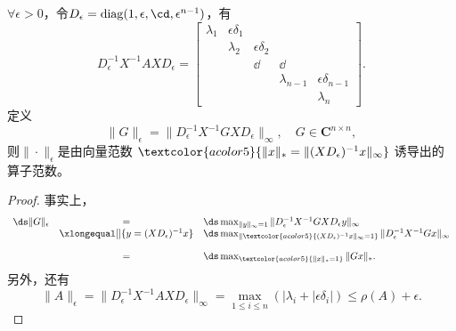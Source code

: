 \begin{frame}\ft{\subsecname}

\begin{zhengming}
$\forall \epsilon > 0$，令$D_{\epsilon} = \mathrm{diag} (1, \epsilon, \cd, \epsilon^{n-1})$，有
$$
D_{\epsilon}^{-1}X^{-1} A X D_{\epsilon} = \left[
\begin{array}{ccccc}
\lambda_1 & \epsilon\delta_1 & & & \\
& \lambda_2 & \epsilon\delta_2 & & \\
& & \dd & \dd &\\
& & & \lambda_{n-1} & \epsilon\delta_{n-1}  \\
& & &  & \lambda_{n} 
\end{array}
\right].
$$
定义
$$
\|G\|_{\epsilon} = \| D_{\epsilon}^{-1}X^{-1} G X D_{\epsilon}  \|_{\infty}, \quad G \in \mathbf{C}^{n\times n},
$$
则$\|\cdot\|_{\epsilon}$是由向量范数
$\textcolor{acolor5}{
\|x\|_* = \| (XD_{\epsilon})^{-1} x \|_{\infty}
}
$
诱导出的算子范数。
\end{zhengming}

\end{frame}


\begin{frame}\ft{\subsecname}

\begin{proof}
事实上，
$$
\begin{array}{rcl}
\ds \|G\|_{\epsilon} &=&  \ds  \max_{\|y\|_{\infty}=1} \| D_{\epsilon}^{-1}X^{-1} G X D_{\epsilon}  y\|_{\infty}\\
&\xlongequal[]{y = (XD_{\epsilon})^{-1}x}&\ds
\max_{\|\textcolor{acolor5}{(XD_{\epsilon})^{-1}x\|_{\infty} =1}}\| D_{\epsilon}^{-1}X^{-1} G  x\|_{\infty} \\[0.4cm]
&=& \ds \max_{\textcolor{acolor5}{\|x\|_{*} =1}}\| G  x\|_{*} .
\end{array}
$$
另外，还有
$$
\|A\|_{\epsilon} = \| D_{\epsilon}^{-1}X^{-1} A X D_{\epsilon}  \|_{\infty}
= \max_{1\le i \le n} (|\lambda_i + |\epsilon \delta_i|) \le \rho(A) + \epsilon.
$$
\end{proof}


\end{frame}




